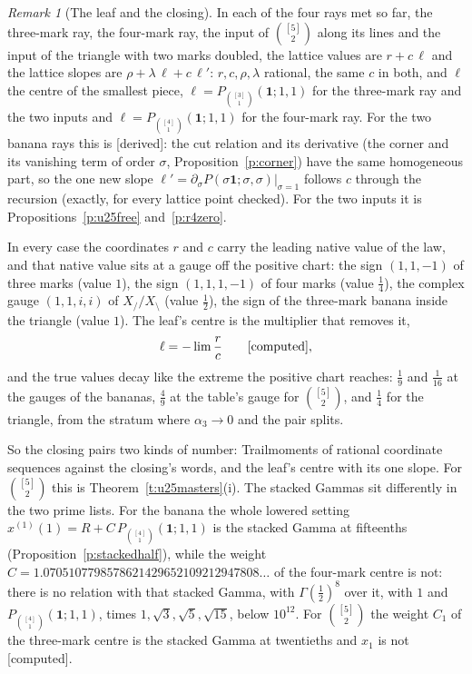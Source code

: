 \documentclass[11pt]{article}
\newcommand{\one}{\mathbf 1}
\newcommand{\Pth}{P_{\binom{[3]}1}(\one;1,1)}
\newcommand{\Pfour}{P_{\binom{[4]}1}(\one;1,1)}
\theoremstyle{plain}
\theoremstyle{definition}
\theoremstyle{remark}
\newtheorem{remark}[proposition]{Remark}
\newcommand{\derived}{\textup{[derived]}}
\newcommand{\computed}{\textup{[computed]}}
\begin{document}
\begin{remark}[The leaf and the closing]\label{r:leaf}
In each of the four rays met so far, the three-mark ray, the four-mark ray, the input of $\binom{[5]}2$ along its lines and the input of the triangle with two marks doubled, the lattice values are $r+c\,\ell$ and the lattice slopes are $\rho+\lambda\,\ell+c\,\ell'$: $r,c,\rho,\lambda$ rational, the same $c$ in both, and $\ell$ the centre of the smallest piece, $\ell=\Pth$ for the three-mark ray and the two inputs and $\ell=\Pfour$ for the four-mark ray. For the two banana rays this is \derived: the cut relation and its derivative (the corner and its vanishing term of order $\sigma$, Proposition~\ref{p:corner}) have the same homogeneous part, so the one new slope $\ell'=\partial_\sigma P(\sigma\one;\sigma,\sigma)|_{\sigma=1}$ follows $c$ through the recursion (exactly, for every lattice point checked). For the two inputs it is Propositions~\ref{p:u25free} and~\ref{p:r4zero}.

In every case the coordinates $r$ and $c$ carry the leading native value of the law, and that native value sits at a gauge off the positive chart: the sign $(1,1,-1)$ of three marks (value $1$), the sign $(1,1,1,-1)$ of four marks (value $\frac14$), the complex gauge $(1,1,i,i)$ of $X_{/}/X_{\setminus}$ (value $\frac12$), the sign of the three-mark banana inside the triangle (value $1$). The leaf's centre is the multiplier that removes it,
\[
\ell=-\lim\frac rc\qquad\computed,
\]
and the true values decay like the extreme the positive chart reaches: $\frac19$ and $\frac1{16}$ at the gauges of the bananas, $\frac49$ at the table's gauge for $\binom{[5]}2$, and $\frac14$ for the triangle, from the stratum where $\alpha_3\to0$ and the pair splits.

So the closing pairs two kinds of number: Trailmoments of rational coordinate sequences against the closing's words, and the leaf's centre with its one slope. For $\binom{[5]}2$ this is Theorem~\ref{t:u25masters}(i). The stacked Gammas sit differently in the two prime lists. For the banana the whole lowered setting $x^{(1)}(1)=R+C\,\Pfour$ is the stacked Gamma at fifteenths (Proposition~\ref{p:stackedhalf}), while the weight $C=1.0705107798578621429652109212947808\ldots$ of the four-mark centre is not: there is no relation with that stacked Gamma, with $\Gamma(\frac12)^8$ over it, with $1$ and $\Pfour$, times $1,\sqrt3,\sqrt5,\sqrt{15}$, below $10^{12}$. For $\binom{[5]}2$ the weight $C_1$ of the three-mark centre is the stacked Gamma at twentieths and $x_1$ is not \computed.
\end{remark}
\end{document}
